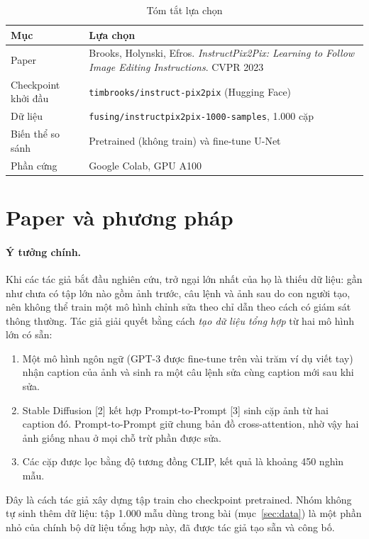 \documentclass[12pt,a4paper]{article}
\begin{document}
\begin{table}[H]
\centering
\caption{Tóm tắt lựa chọn}
\begin{tabular}{l>{\raggedright\arraybackslash}p{10.5cm}}
\toprule
Mục & Lựa chọn \\
\midrule
Paper & Brooks, Holynski, Efros. \emph{InstructPix2Pix: Learning to Follow Image
Editing Instructions}. CVPR 2023 \\
Checkpoint khởi đầu & \texttt{timbrooks/instruct-pix2pix} (Hugging Face) \\
Dữ liệu & \texttt{fusing/instructpix2pix-1000-samples}, 1.000 cặp \\
Biến thể so sánh & Pretrained (không train) và fine-tune U-Net \\
Phần cứng & Google Colab, GPU A100 \\
\bottomrule
\end{tabular}
\end{table}

\section{Paper và phương pháp}

\paragraph{Ý tưởng chính.} Khi các tác giả bắt đầu nghiên cứu, trở ngại lớn nhất
của họ là thiếu dữ liệu: gần như chưa có tập lớn nào gồm ảnh trước, câu lệnh và
ảnh sau do con người tạo, nên không thể train một mô hình chỉnh sửa theo chỉ dẫn
theo cách có giám sát thông thường. Tác giả giải quyết bằng cách \emph{tạo dữ liệu
tổng hợp} từ hai mô hình lớn có sẵn:
\begin{enumerate}
\item Một mô hình ngôn ngữ (GPT-3 được fine-tune trên vài trăm ví dụ viết tay) nhận
caption của ảnh và sinh ra một câu lệnh sửa cùng caption mới sau khi sửa.
\item Stable Diffusion [2] kết hợp Prompt-to-Prompt [3] sinh cặp ảnh từ hai caption
đó. Prompt-to-Prompt giữ chung bản đồ cross-attention, nhờ vậy hai ảnh giống nhau ở
mọi chỗ trừ phần được sửa.
\item Các cặp được lọc bằng độ tương đồng CLIP, kết quả là khoảng 450 nghìn mẫu.
\end{enumerate}

Đây là cách tác giả xây dựng tập train cho checkpoint pretrained. Nhóm không tự sinh
thêm dữ liệu: tập 1.000 mẫu dùng trong bài (mục~\ref{sec:data}) là một phần nhỏ của
chính bộ dữ liệu tổng hợp này, đã được tác giả tạo sẵn và công bố.
\end{document}
